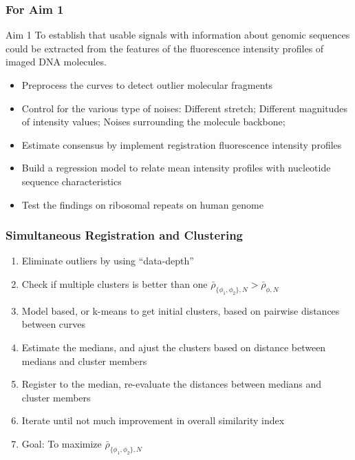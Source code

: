 \documentclass[10pt,dvipsnames,table]{beamer}
\begin{document}

\begin{frame}
\frametitle{For Aim 1}
\begin{block}{Aim 1}
To establish that usable signals with information about genomic sequences could be extracted from the features of the fluorescence intensity profiles of imaged DNA molecules.
\end{block}
\begin{itemize}
\item[\checkmark] Preprocess the curves to detect outlier molecular fragments
\item[\checkmark] Control for the various type of noises: Different stretch; Different magnitudes of intensity values; Noises surrounding the molecule backbone; 
\item[\checkmark] Estimate consensus by implement registration fluorescence intensity profiles
\item Build a regression model to relate mean intensity profiles with nucleotide sequence characteristics
\item Test the findings on ribosomal repeats on human genome
\end{itemize}
\end{frame}

\begin{frame}
\frametitle{Simultaneous Registration and Clustering}
\begin{enumerate}
\item Eliminate outliers by using ``data-depth''
\item Check if multiple clusters is better than one $\bar{\rho}_{\{\phi_1, \phi_2\}, N} > \bar{\rho}_{\phi, N}$
\item Model based, or k-means to get initial clusters, based on pairwise distances between curves
\item Estimate the medians, and ajust the clusters based on distance between medians and cluster members
\item Register to the median, re-evaluate the distances between medians and cluster members
\item Iterate until not much improvement in overall similarity index
\item Goal: To maximize $\bar{\rho}_{\{\phi_1, \phi_2\}, N}$
\end{enumerate}
\end{frame}
\end{document}
